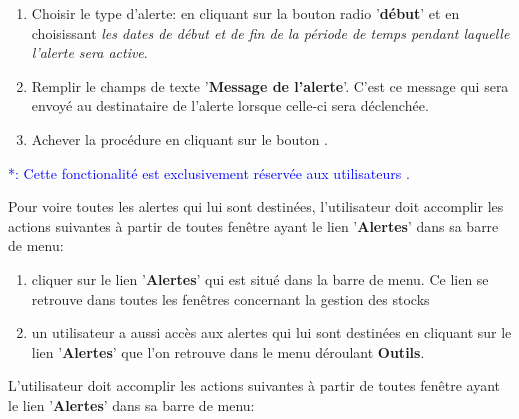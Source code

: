 \begin{enumerate}[1)]
		Le nom complet du destinataire est affich\'e automatiquement
		dans le champs de texte '\textbf{nom du destinataire}',
		qui est situ\'e juste \`a droite du champs de texte
		'\textbf{ID du destinataire}'.
		
	\item Choisir le type d'alerte:	
		en cliquant sur la bouton radio '\textbf{d\'ebut}' et 
		en choisissant \emph{les dates de d\'ebut et de fin de
		la p\'eriode de temps pendant laquelle l'alerte sera active}.
		
	\item Remplir le champs de texte '\textbf{Message de l'alerte}'.
		C'est ce message qui sera envoy\'e au destinataire de
		l'alerte lorsque celle-ci sera d\'eclench\'ee.	
		
	\item Achever la proc\'edure en cliquant sur le bouton .
\end{enumerate}


\newpage
{}\label{sec:voire-toutes-alertes}

\textcolor{blue}{*: Cette fonctionalit\'e est exclusivement
	r\'eserv\'ee aux utilisateurs \patron.}

Pour voire toutes les alertes qui lui sont destin\'ees, l'utilisateur
doit accomplir les actions suivantes \`a partir de toutes fen\^etre
ayant le lien '\textbf{Alertes}' dans sa barre de menu:
\begin{enumerate}[1)]
	\item cliquer sur le lien '\textbf{Alertes}' qui est situ\'e
	dans la barre de menu. Ce lien se retrouve dans toutes les
	fen\^etres concernant la gestion des stocks
	
	\item un utilisateur a aussi acc\`es aux alertes qui lui sont destin\'ees en cliquant sur le lien '\textbf{Alertes}' que
	l'on retrouve dans le menu d\'eroulant \textbf{Outils}.
\end{enumerate}


\label{sec:voire-details-alerte}

L'utilisateur doit accomplir les actions suivantes \`a
partir de toutes fen\^etre ayant le lien '\textbf{Alertes}'
dans sa barre de menu:

